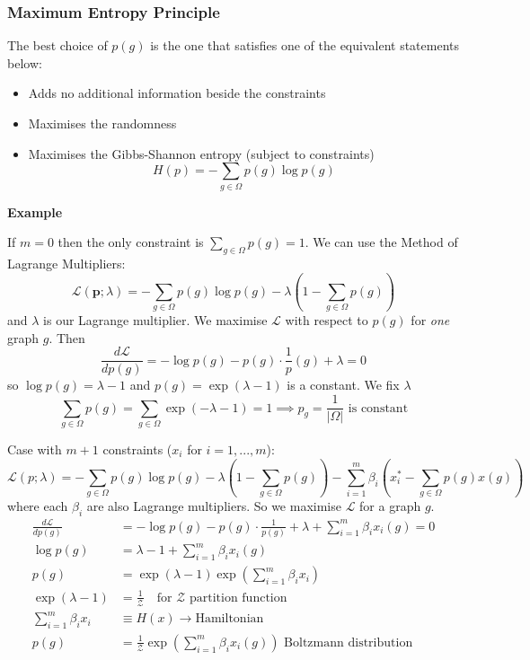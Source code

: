 \documentclass[12pt]{article}
\theoremstyle{definition}
\begin{document}
\subsubsection{Maximum Entropy Principle}

The best choice of $p(g)$ is the one that satisfies one of the equivalent statements below: 
\begin{itemize}
    \item Adds no additional information beside the constraints
    \item Maximises the randomness
    \item Maximises the Gibbs-Shannon entropy (subject to constraints)
    \[
    H(p)=-\sum_{g\in\Omega}p(g)\log p(g)
    \]
\end{itemize}

\textbf{Example}

If $m=0$ then the only constraint is $\sum_{g\in \Omega} p(g) =1$. We can use the Method of Lagrange Multipliers: 
\[
\mathcal L (\boldsymbol p ; \lambda ) = -\sum_{g\in \Omega} p(g)\log p(g) - \lambda \left( 1-\sum_{g\in \Omega} p(g)\right)
\]
and $\lambda$ is our Lagrange multiplier. We maximise $\mathcal L$ with respect to $p(g)$ for \textit{one} graph $g$. Then
\[ 
\frac{d\mathcal L}{d p(g)} = -\log p(g) - p(g)\cdot \frac 1p(g) +\lambda = 0
\]
so $\log p(g) = \lambda - 1$ and $p(g)=\exp(\lambda -1)$ is a constant. We fix $\lambda$ 
\[ \sum_{g\in \Omega} p(g) = \sum_{g\in \Omega} \exp(-\lambda-1) = 1 \implies p_g=\frac{1}{|\Omega|} \text{ is constant}\] 

Case with $m+1$ constraints ($x_i$ for $i=1,...,m$): 
\[
\mathcal L(p;\lambda)=-\sum_{g\in\Omega}p(g)\log p(g)-\lambda\left(1-\sum_{g\in\Omega}p(g)\right) - \sum_{i=1}^m\beta_i\left(x_i^*-\sum_{g\in\Omega}p(g)x(g)\right)
\]
where each $\beta_i$ are also Lagrange multipliers. So we maximise $\mathcal L$ for a graph $g$.
\begin{align*}
\frac{d\mathcal L}{d p(g)} &= -\log p(g) - p(g)\cdot \frac{1}{p(g)} + \lambda +\sum_{i=1}^m \beta_i x_i(g) = 0\\
\log p(g) &= \lambda-1+\sum_{i=1}^m \beta_i x_i(g) \\
p(g) &= \exp(\lambda-1)\exp\left(\sum_{i=1}^m\beta_ix_i\right)\\
\exp(\lambda-1) &= \frac{1}{\mathcal Z} \quad \text{for } \mathcal Z \text{ partition function}\\
\sum_{i=1}^m \beta_i x_i &\equiv H(x) \to \mathrm{Hamiltonian}\\
p(g)&=\frac{1}{\mathcal Z} \exp(\sum_{i=1}^m \beta_i x_i(g)) \text{ Boltzmann distribution}
\end{align*}
\end{document}
